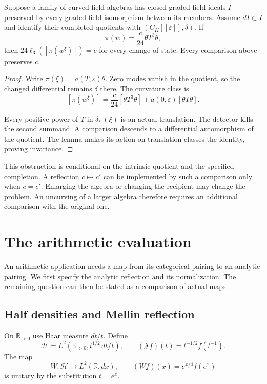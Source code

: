 \begin{theorem}
\label{v4-arith:md:thm:curvature}
Suppose a family of curved field
algebras has closed graded field ideals
$I$ preserved by every graded field
isomorphism between its members.
Assume $dI\subset I$ and identify
their completed quotients with
$(C_K[[\varepsilon]],\delta)$.
If
\[
 \pi(w)=\frac c{24}\theta T^3\theta,
\]
then $24\ell_3([\pi(w^\xi)])=c$
for every change of state.
Every comparison above preserves $c$.
\end{theorem}

\begin{proof}
Write $\pi(\xi)=a(T,\varepsilon)\theta$.
Zero modes vanish in the quotient,
so the changed differential remains
$\delta$ there.
The curvature class is
\[
 [\pi(w^\xi)]
  =\frac c{24}[\theta T^3\theta]
      +a(0,\varepsilon)[\theta T\theta].
\]

Every positive power of $T$ in
$\delta\pi(\xi)$ is an actual
translation. The detector kills
the second summand.
A comparison descends to a
differential automorphism of the
quotient. The lemma makes its
action on translation classes the
identity, proving invariance.
\end{proof}

This obstruction is conditional on
the intrinsic quotient and the
specified completion.
A reflection $c\mapsto c'$ can be
implemented by such a comparison
only when $c=c'$.
Enlarging the algebra or changing
the recipient may change the
problem. An uncurving of a larger
algebra therefore requires an
additional comparison with the
original one.

\section{The arithmetic evaluation}
\label{v4-arith:md:sec:mellin}

An arithmetic application needs
a map from its categorical pairing
to an analytic pairing.
We first specify the analytic
reflection and its normalization.
The remaining question can then
be stated as a comparison of
actual maps.

\subsection{Half densities and Mellin reflection}

On $\mathbb R_{>0}$ use Haar measure
$dt/t$. Define
\[
 \mathcal H=L^2(\mathbb R_{>0},
                         t^{1/2}\,dt/t),\qquad
 (\mathcal Jf)(t)=t^{-1/2}f(t^{-1}).
\]
The map
\[
 W:\mathcal H\longrightarrow L^2(\mathbb R,dx),
 \qquad (Wf)(x)=e^{x/4}f(e^x)
\]
is unitary by the substitution $t=e^x$.

